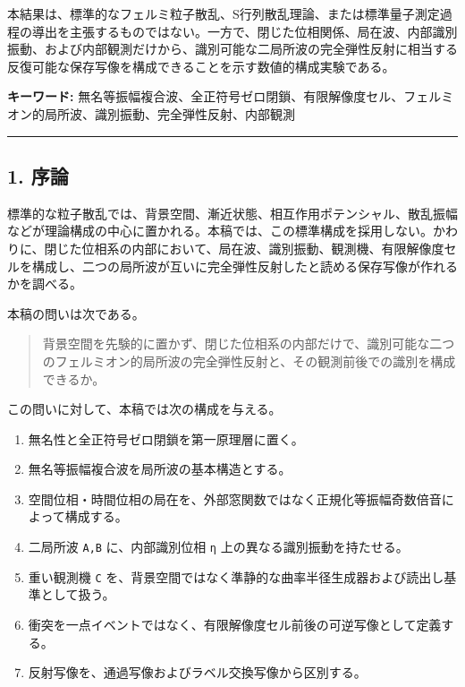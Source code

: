 \documentclass[
  a4paper,
]{article}
\providecommand{\tightlist}{%
  \setlength{\itemsep}{0pt}\setlength{\parskip}{0pt}}
\begin{document}
本結果は、標準的なフェルミ粒子散乱、S行列散乱理論、または標準量子測定過程の導出を主張するものではない。一方で、閉じた位相関係、局在波、内部識別振動、および内部観測だけから、識別可能な二局所波の完全弾性反射に相当する反復可能な保存写像を構成できることを示す数値的構成実験である。

\textbf{キーワード:}
無名等振幅複合波、全正符号ゼロ閉鎖、有限解像度セル、フェルミオン的局所波、識別振動、完全弾性反射、内部観測

\begin{center}\rule{0.5\linewidth}{0.5pt}\end{center}

\subsection{1. 序論}\label{ux5e8fux8ad6}

標準的な粒子散乱では、背景空間、漸近状態、相互作用ポテンシャル、散乱振幅などが理論構成の中心に置かれる。本稿では、この標準構成を採用しない。かわりに、閉じた位相系の内部において、局在波、識別振動、観測機、有限解像度セルを構成し、二つの局所波が互いに完全弾性反射したと読める保存写像が作れるかを調べる。

本稿の問いは次である。

\begin{quote}
背景空間を先験的に置かず、閉じた位相系の内部だけで、識別可能な二つのフェルミオン的局所波の完全弾性反射と、その観測前後での識別を構成できるか。
\end{quote}

この問いに対して、本稿では次の構成を与える。

\begin{enumerate}
\def\labelenumi{\arabic{enumi}.}
\tightlist
\item
  無名性と全正符号ゼロ閉鎖を第一原理層に置く。
\item
  無名等振幅複合波を局所波の基本構造とする。
\item
  空間位相・時間位相の局在を、外部窓関数ではなく正規化等振幅奇数倍音によって構成する。
\item
  二局所波 \texttt{A,B} に、内部識別位相 \texttt{η}
  上の異なる識別振動を持たせる。
\item
  重い観測機 \texttt{C}
  を、背景空間ではなく準静的な曲率半径生成器および読出し基準として扱う。
\item
  衝突を一点イベントではなく、有限解像度セル前後の可逆写像として定義する。
\item
  反射写像を、通過写像およびラベル交換写像から区別する。
\end{enumerate}
\end{document}
